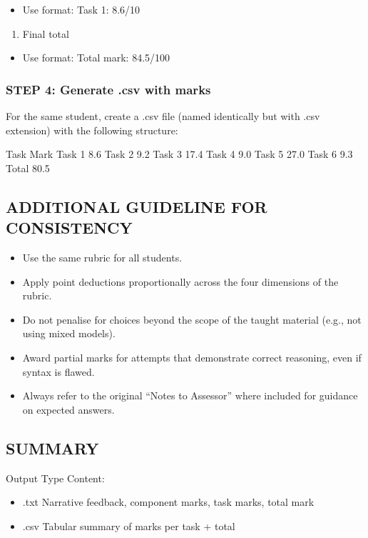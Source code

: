 \documentclass[
  10pt,
]{article}
\providecommand{\tightlist}{%
  \setlength{\itemsep}{0pt}\setlength{\parskip}{0pt}}
\begin{document}
\begin{itemize}
\tightlist
\item
  Use format: Task 1: 8.6/10
\end{itemize}

\begin{enumerate}
\def\labelenumi{\arabic{enumi}.}
\setcounter{enumi}{3}
\tightlist
\item
  Final total
\end{enumerate}

\begin{itemize}
\tightlist
\item
  Use format: Total mark: 84.5/100
\end{itemize}

\subsubsection{STEP 4: Generate .csv with
marks}\label{step-4-generate-.csv-with-marks}

For the same student, create a .csv file (named identically but with
.csv extension) with the following structure:

Task Mark Task 1 8.6 Task 2 9.2 Task 3 17.4 Task 4 9.0 Task 5 27.0 Task
6 9.3 Total 80.5

\subsection{ADDITIONAL GUIDELINE FOR
CONSISTENCY}\label{additional-guideline-for-consistency}

\begin{itemize}
\tightlist
\item
  Use the same rubric for all students.
\item
  Apply point deductions proportionally across the four dimensions of
  the rubric.
\item
  Do not penalise for choices beyond the scope of the taught material
  (e.g., not using mixed models).
\item
  Award partial marks for attempts that demonstrate correct reasoning,
  even if syntax is flawed.
\item
  Always refer to the original ``Notes to Assessor'' where included for
  guidance on expected answers.
\end{itemize}

\subsection{SUMMARY}\label{summary}

Output Type Content:

\begin{itemize}
\tightlist
\item
  .txt Narrative feedback, component marks, task marks, total mark
\item
  .csv Tabular summary of marks per task + total
\end{itemize}
\end{document}
